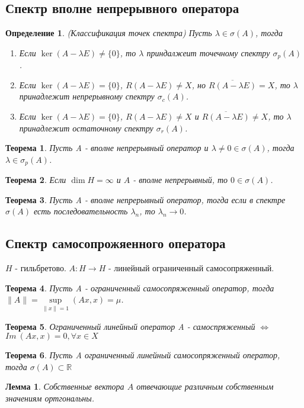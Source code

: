 \documentclass[9pt, a4paper]{extarticle}
\newtheorem{theorem}{Теорема}
\newtheorem{lemma}{Лемма}
\newtheorem{definition}{Определение}
\numberwithin{equation}{section}
\numberwithin{lemma}{section}
\numberwithin{definition}{section}
\numberwithin{notabene}{section}
\numberwithin{corollary}{section}
\begin{document}
\subsection{Спектр вполне непрерывного оператора}
	\begin{definition}
		(Классификация точек спектра) \newline
		Пусть $\lambda \in \sigma(A)$, тогда
		\begin{enumerate}
			\item Если $\ker{(A - \lambda E)} \neq \{0\}$, то $\lambda$ приндалжеит точечному спектру $\sigma_p(A)$.
			\item Если $\ker{(A - \lambda E)} = \{0\}$, $R(A - \lambda E) \neq X$, но $\overline{R(A - \lambda E)} = X$, то $\lambda$ принадлежит непрерывному спектру $\sigma_c(A)$.
			\item Если $\ker{(A - \lambda E)} = \{0\}$, $R(A - \lambda E) \neq X$ и $\overline{R(A - \lambda E)} \neq X$, то $\lambda$ принадлежит остаточному спектру $\sigma_r(A)$.
		\end{enumerate}	
	\end{definition}
	\begin{theorem}
		Пусть A - вполне непрерывный оператор и $\lambda \neq 0  \in \sigma(A)$, тогда $\lambda \in \sigma_p(A)$.
	\end{theorem}
	\begin{theorem}
		Если $\dim{H} = \infty$ и $A$ - вполне непрерывный, то $0 \in \sigma(A)$. 	
	\end{theorem}
	\begin{theorem}
		Пусть A - вполне непрерывный оператор, тогда если в спектре $\sigma(A)$ есть последовательность $\lambda_n$, то $\lambda_n \to 0$. 
	\end{theorem}
	
\subsection{Спектр самосопрожяенного оператора}
	$H$ - гильбретово. $A: H \to H$ - линейный ограниченный самосопряженный. 
	\begin{theorem}
		Пусть A - ограниченный самосопряженный оператор, тогда $\|A\| = \sup\limits_{\|x\| = 1} (Ax, x) = \mu$. 
	\end{theorem}
	\begin{theorem}
		Ограниченный линейный оператор A - самоспряженный $\Leftrightarrow$ $Im \ (Ax, x) = 0, \forall x \in X$
	\end{theorem}
	\begin{theorem}
		Пусть A ограниченный линейный самосопряженный оператор, тогда $\sigma(A) \subset \mathbb{R}$
	\end{theorem}
	\begin{lemma}
		Собственные вектора $A$ отвечающие различным собственным значениям ортгональны. 
	\end{lemma}
\end{document}
